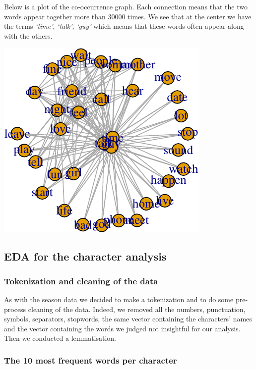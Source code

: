 \documentclass[
]{article}
\begin{document}
Below is a plot of the co-occurrence graph. Each connection means that
the two words appear together more than 30000 times. We see that at the
center we have the terms \emph{`time'}, \emph{`talk'}, \emph{`guy'}
which means that these words often appear along with the others.

\includegraphics{report_files/figure-latex/unnamed-chunk-24-1.pdf}

\hypertarget{eda-for-the-character-analysis}{%
\subsection{EDA for the character
analysis}\label{eda-for-the-character-analysis}}

\hypertarget{tokenization-and-cleaning-of-the-data-1}{%
\subsubsection{Tokenization and cleaning of the
data}\label{tokenization-and-cleaning-of-the-data-1}}

As with the season data we decided to make a tokenization and to do some
pre-process cleaning of the data. Indeed, we removed all the numbers,
punctuation, symbols, separators, stopwords, the same vector containing
the characters' names and the vector containing the words we judged not
insightful for our analysis. Then we conducted a lemmatisation.

\hypertarget{the-10-most-frequent-words-per-character}{%
\subsubsection{The 10 most frequent words per
character}\label{the-10-most-frequent-words-per-character}}
\end{document}
